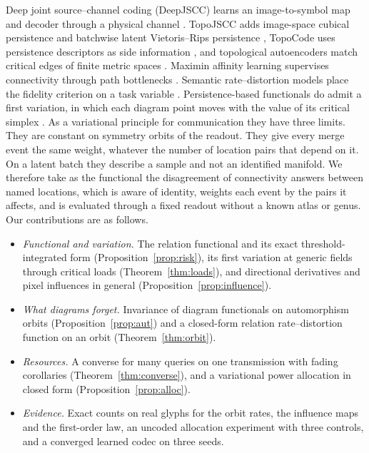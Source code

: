 \documentclass[10pt,conference]{IEEEtran}
\begin{document}
Deep joint source--channel coding (DeepJSCC) learns an image-to-symbol map and decoder through a physical channel \cite{bourtsoulatze2019deep}. TopoJSCC adds image-space cubical persistence and batchwise latent Vietoris--Rips persistence \cite{erak2026topojscc}, TopoCode uses persistence descriptors as side information \cite{guo2025topocodetopologicallyinformederror}, and topological autoencoders match critical edges of finite metric spaces \cite{moor2020topological}. Maximin affinity learning supervises connectivity through path bottlenecks \cite{turaga2009malis}. Semantic rate--distortion models place the fidelity criterion on a task variable \cite{liu2022indirect,Stavrou_2023}. Persistence-based functionals do admit a first variation, in which each diagram point moves with the value of its critical simplex \cite{carriere2021optimizing}. As a variational principle for communication they have three limits. They are constant on symmetry orbits of the readout. They give every merge event the same weight, whatever the number of location pairs that depend on it. On a latent batch they describe a sample and not an identified manifold. We therefore take as the functional the disagreement of connectivity answers between named locations, which is aware of identity, weights each event by the pairs it affects, and is evaluated through a fixed readout without a known atlas or genus. Our contributions are as follows.
\begin{itemize}
\item \emph{Functional and variation.} The relation functional and its exact threshold-integrated form (Proposition~\ref{prop:risk}), its first variation at generic fields through critical loads (Theorem~\ref{thm:loads}), and directional derivatives and pixel influences in general (Proposition~\ref{prop:influence}).
\item \emph{What diagrams forget.} Invariance of diagram functionals on automorphism orbits (Proposition~\ref{prop:aut}) and a closed-form relation rate--distortion function on an orbit (Theorem~\ref{thm:orbit}).
\item \emph{Resources.} A converse for many queries on one transmission with fading corollaries (Theorem~\ref{thm:converse}), and a variational power allocation in closed form (Proposition~\ref{prop:alloc}).
\item \emph{Evidence.} Exact counts on real glyphs for the orbit rates, the influence maps and the first-order law, an uncoded allocation experiment with three controls, and a converged learned codec on three seeds.
\end{itemize}
\end{document}
